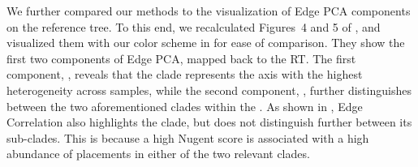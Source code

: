 We further compared our methods to the visualization of Edge PCA components on the reference tree.
To this end, we recalculated Figures~4 and 5 of ,
and visualized them with our color scheme in  for ease of comparison.
They show the first two components of Edge PCA, mapped back to the \ac{RT}.
The first component, ,
reveals that the  clade represents the axis with the highest heterogeneity across samples,
while the second component, ,
further distinguishes between the two aforementioned clades within the .
As shown in , Edge Correlation also highlights the  clade,
but does not distinguish further between its sub-clades.
This is because a high Nugent score is associated
with a high abundance of placements in either of the two relevant  clades.


